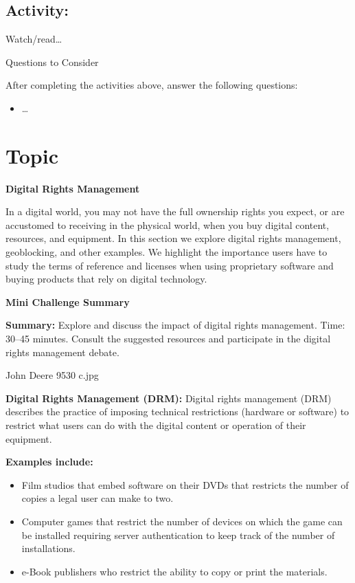\documentclass[
]{book}
\providecommand{\tightlist}{%
  \setlength{\itemsep}{0pt}\setlength{\parskip}{0pt}}
\theoremstyle{definition}
\theoremstyle{definition}
\theoremstyle{definition}
\theoremstyle{definition}
\theoremstyle{remark}
\begin{document}
\hypertarget{activity-9}{%
\subsection*{Activity:}\label{activity-9}}

\begin{reflect}
Watch/read\ldots{}

{Questions to Consider}

After completing the activities above, answer the following questions:

\begin{itemize}
\tightlist
\item
  \ldots{}
\end{itemize}
\end{reflect}

\hypertarget{topic-6}{%
\section{Topic}\label{topic-6}}

\textbf{Digital Rights Management}

In a digital world, you may not have the full ownership rights you expect, or are accustomed to receiving in the physical world, when you buy digital content, resources, and equipment. In this section we explore digital rights management, geoblocking, and other examples. We highlight the importance users have to study the terms of reference and licenses when using proprietary software and buying products that rely on digital technology.

\textbf{Mini Challenge Summary}

\textbf{Summary:} Explore and discuss the impact of digital rights management. Time: 30--45 minutes. Consult the suggested resources and participate in the digital rights management debate.

{John Deere 9530 c.jpg}

\textbf{Digital Rights Management (DRM):} Digital rights management (DRM) describes the practice of imposing technical restrictions (hardware or software) to restrict what users can do with the digital content or operation of their equipment.

\textbf{Examples include:}

\begin{itemize}
\tightlist
\item
  Film studios that embed software on their DVDs that restricts the number of copies a legal user can make to two.\\
\item
  Computer games that restrict the number of devices on which the game can be installed requiring server authentication to keep track of the number of installations.\\
\item
  e-Book publishers who restrict the ability to copy or print the materials.
\end{itemize}
\end{document}
